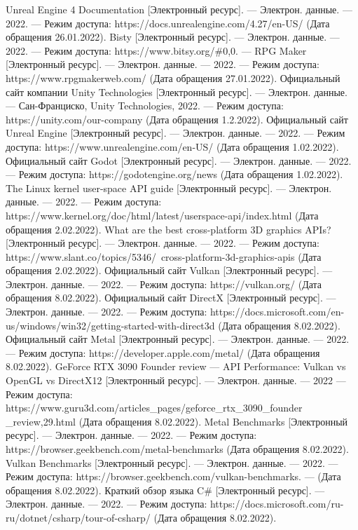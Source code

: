 \begin{thebibliography}{3}
Unreal Engine 4 Documentation [Электронный ресурс]. --- Электрон. данные. --- 2022. --- Режим доступа: https://docs.unrealengine.com/4.27/en-US/ (Дата обращения 26.01.2022).
Bisty [Электронный ресурс]. --- Электрон. данные. --- 2022. --- Режим доступа: https://www.bitsy.org/\#0,0. ---
RPG Maker [Электронный ресурс]. --- Электрон. данные. --- 2022. --- Режим доступа: https://www.rpgmakerweb.com/ (Дата обращения 27.01.2022).
Официальный сайт компании Unity Technologies [Электронный ресурс]. --- Электрон. данные. --- Сан-Франциско, Unity Technologies, 2022. --- Режим доступа: https://unity.com/our-company (Дата обращения 1.2.2022).
Официальный сайт Unreal Engine [Электронный ресурс]. --- Электрон. данные. --- 2022. --- Режим доступа: https://www.unrealengine.com/en-US/ (Дата обращения 1.02.2022).
Официальный сайт Godot [Электронный ресурс]. --- Электрон. данные. --- 2022. --- Режим доступа:  https://godotengine.org/news (Дата обращения 1.02.2022).
The Linux kernel user-space API guide [Электронный ресурс]. --- Электрон. данные. --- 2022. --- Режим доступа: https://www.kernel.org/doc/html/latest/userspace-api/index.html (Дата обращения 2.02.2022).
What are the best cross-platform 3D graphics APIs? [Электронный ресурс]. --- Электрон. данные. --- 2022. --- Режим доступа: https://www.slant.co/topics/5346/~cross-platform-3d-graphics-apis  (Дата обращения 2.02.2022).
Официальный сайт Vulkan [Электронный ресурс]. --- Электрон. данные. --- 2022. --- Режим доступа: https://vulkan.org/ (Дата обращения 8.02.2022).
Официальный сайт DirectX [Электронный ресурс]. --- Электрон. данные. --- 2022. --- Режим доступа: https://docs.microsoft.com/en-us/windows/win32/getting-started-with-direct3d (Дата обращения 8.02.2022).
Официальный сайт Metal [Электронный ресурс]. --- Электрон. данные. --- 2022. --- Режим доступа: https://developer.apple.com/metal/ (Дата обращения 8.02.2022).
GeForce RTX 3090 Founder review --- API Performance: Vulkan vs OpenGL vs DirectX12  [Электронный ресурс]. --- Электрон. данные. --- 2022 --- Режим доступа: https://www.guru3d.com/articles\_pages/geforce\_rtx\_3090\_founder \_review,29.html (Дата обращения 8.02.2022).
Metal Benchmarks [Электронный ресурс]. --- Электрон. данные. --- 2022. --- Режим доступа: https://browser.geekbench.com/metal-benchmarks (Дата обращения 8.02.2022).
Vulkan Benchmarks [Электронный ресурс]. --- Электрон. данные. --- 2022. --- Режим доступа: https://browser.geekbench.com/vulkan-benchmarks. --- (Дата обращения 8.02.2022).
Краткий обзор языка C\# [Электронный ресурс]. --- Электрон. данные. --- 2022. --- Режим доступа: https://docs.microsoft.com/ru-ru/dotnet/csharp/tour-of-csharp/ (Дата обращения 8.02.2022).
\end{thebibliography}